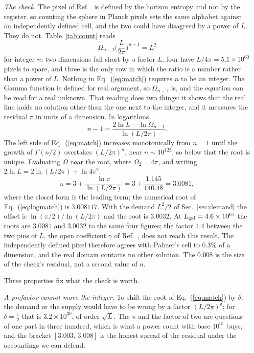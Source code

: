 \documentclass[aps,prd,twocolumn,superscriptaddress,nofootinbib]{revtex4-2}
\begin{document}
\textit{The check.} The pixel of Ref.~\cite{korytko2026} is defined by the horizon entropy and not by the register, so counting the sphere in Planck pixels sets the same alphabet against an independently defined cell, and the two could have disagreed by a power of $L$. They do not. Table~\ref{tab:count} reads
\begin{equation}
\Omega_{n-1}\Big(\frac{L}{2\pi}\Big)^{n-1} = L^2
\label{eq:match}
\end{equation}
for integer $n$: two dimensions fall short by a factor $L$, four have $L/4\pi = 5.1\times10^{60}$ pixels to spare, and three is the only row in which the ratio is a number rather than a power of $L$. Nothing in Eq.~(\ref{eq:match}) requires $n$ to be an integer. The Gamma function is defined for real argument, so $\Omega_{n-1}$ is, and the equation can be read for a real unknown. That reading does two things: it shows that the real line holds no solution other than the one next to the integer, and it measures the residual $\pi$ in units of a dimension. In logarithms,
\begin{equation}
n - 1 = \frac{2\ln L - \ln\Omega_{n-1}}{\ln(L/2\pi)} .
\label{eq:logmatch}
\end{equation}
The left side of Eq.~(\ref{eq:match}) increases monotonically from $n = 1$ until the growth of $\Gamma(n/2)$ overtakes $(L/2\pi)^{n}$, near $n \sim 10^{123}$, so below that the root is unique. Evaluating $\Omega$ near the root, where $\Omega_2 = 4\pi$, and writing $2\ln L = 2\ln(L/2\pi) + \ln 4\pi^2$,
\begin{equation}
n = 3 + \frac{\ln\pi}{\ln(L/2\pi)} = 3 + \frac{1.145}{140.48} = 3.0081 ,
\label{eq:root}
\end{equation}
where the closed form is the leading term; the numerical root of Eq.~(\ref{eq:logmatch}) is $3.008117$. With the demand $L^2/2$ of Sec.~\ref{sec:demand} the offset is $\ln(\pi/2)/\ln(L/2\pi)$ and the root is $3.0032$. At $L_{\rm gal} = 4.6\times10^{61}$ the roots are $3.0081$ and $3.0032$ to the same four figures; the factor $1.4$ between the two pins of $L$, the open coefficient $\gamma$ of Ref.~\cite{korytko2026}, does not reach this result. The independently defined pixel therefore agrees with Palmer's cell to $0.3\%$ of a dimension, and the real domain contains no other solution. The $0.008$ is the size of the check's residual, not a second value of $n$.

Three properties fix what the check is worth.

\textit{A prefactor cannot move the integer.} To shift the root of Eq.~(\ref{eq:match}) by $\delta$, the demand or the supply would have to be wrong by a factor $(L/2\pi)^{\delta}$; for $\delta = \tfrac12$ that is $3.2\times10^{30}$, of order $\sqrt L$. The $\pi$ and the factor of two are questions of one part in three hundred, which is what a power count with base $10^{61}$ buys, and the bracket $[3.003,\,3.008]$ is the honest spread of the residual under the accountings we can defend.
\end{document}
